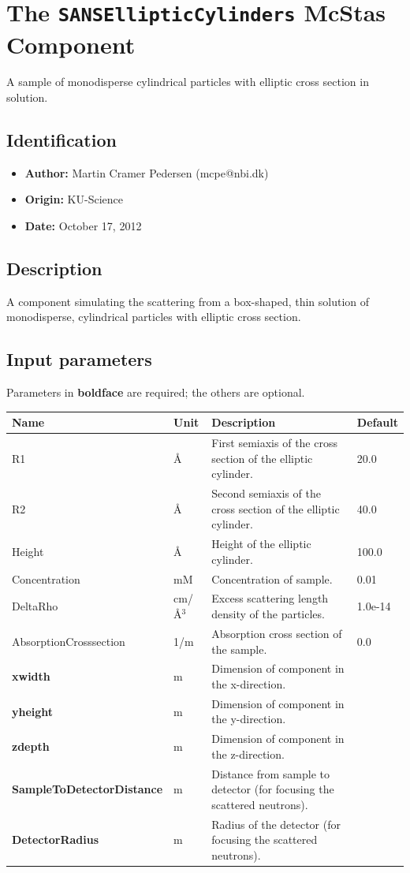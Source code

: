 \section{The \texttt{SANSEllipticCylinders} McStas Component}
A sample of monodisperse cylindrical particles with elliptic cross section in
solution.

\subsection*{Identification}
\begin{itemize}
  \item \textbf{Author:} Martin Cramer Pedersen (mcpe@nbi.dk)
  \item \textbf{Origin:} KU-Science
  \item \textbf{Date:} October 17, 2012
\end{itemize}

\subsection*{Description}
A component simulating the scattering from a box-shaped, thin solution of monodisperse, cylindrical particles with elliptic cross section.

\subsection*{Input parameters}
Parameters in \textbf{boldface} are required; the others are optional.

\begin{longtable}{p{}p{}p{}p{}}
\toprule
\textbf{Name} & \textbf{Unit} & \textbf{Description} & \textbf{Default} \\
\midrule
\endhead
R1 & \AA{} & First semiaxis of the cross section of the elliptic cylinder. & 20.0 \\
R2 & \AA{} & Second semiaxis of the cross section of the elliptic cylinder. & 40.0 \\
Height & \AA{} & Height of the elliptic cylinder. & 100.0 \\
Concentration & mM & Concentration of sample. & 0.01 \\
DeltaRho & cm/\AA{}$^{3}$ & Excess scattering length density of the particles. & 1.0e-14 \\
AbsorptionCrosssection & 1/m & Absorption cross section of the sample. & 0.0 \\
\textbf{xwidth} & m & Dimension of component in the x-direction. &  \\
\textbf{yheight} & m & Dimension of component in the y-direction. &  \\
\textbf{zdepth} & m & Dimension of component in the z-direction. &  \\
\textbf{SampleToDetectorDistance} & m & Distance from sample to detector (for focusing the scattered neutrons). &  \\
\textbf{DetectorRadius} & m & Radius of the detector (for focusing the scattered neutrons). &  \\
\bottomrule
\end{longtable}

